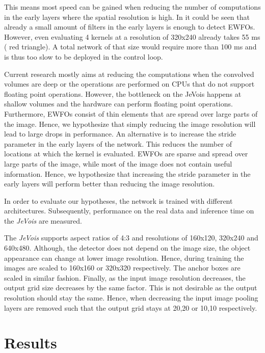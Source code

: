 This means most speed can be gained when reducing the number of computations in the early layers where the spatial resolution is high. In  it could be seen that already a small amount of filters in the early layers is enough to detect \acp{EWFO}. However, even evaluating 4 kernels at a resolution of 320x240 already takes 55 ms ( red triangle). A total network of that size would require more than 100 ms and is thus too slow to be deployed in the control loop.

Current research mostly aims at reducing the computations when the convolved volumes are deep or the operations are performed on \acp{CPU} that do not support floating point operations. However, the bottleneck on the JeVois happens at shallow volumes and the hardware can perform floating point operations. Furthermore, \acp{EWFO} consist of thin elements that are spread over large parts of the image. Hence, we hypothesize that simply reducing the image resolution will lead to large drops in performance. An alternative is to increase the stride parameter in the early layers of the network. This reduces the number of locations at which the kernel is evaluated. \acp{EWFO} are sparse and spread over large parts of the image, while most of the image does not contain useful information. Hence, we hypothesize that increasing the stride parameter in the early layers will perform better than reducing the image resolution.

In order to evaluate our hypotheses, the network is trained with different architectures. Subsequently, performance on the real data and inference time on the \textit{JeVois} are measured.

The \textit{JeVois} supports aspect ratios of 4:3 and resolutions of 160x120, 320x240 and 640x480. Although, the detector does not depend on the image size, the object appearance can change at lower image resolution. Hence, during training the images are scaled to 160x160 or 320x320 respectively. The anchor boxes are scaled in similar fashion. Finally, as the input image resolution decreases, the output grid size decreases by the same factor. This is not desirable as the output resolution should stay the same. Hence, when decreasing the input image pooling layers are removed such that the output grid stays at 20,20 or 10,10 respectively.

\section{Results}


